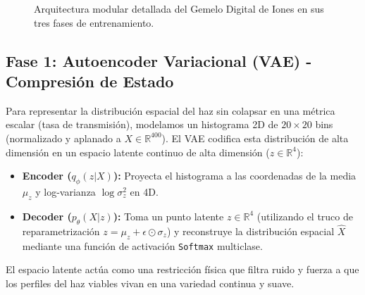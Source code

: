 \documentclass[12pt,letterpaper]{article}
\begin{document}
\begin{figure}[H]
    \caption{Arquitectura modular detallada del Gemelo Digital de Iones en sus tres fases de entrenamiento.}
    \label{fig:arquitectura_block}
\end{figure}

\subsection{Fase 1: Autoencoder Variacional (VAE) - Compresión de Estado}
Para representar la distribución espacial del haz sin colapsar en una métrica escalar (tasa de transmisión), modelamos un histograma 2D de $20 \times 20$ bins (normalizado y aplanado a $X \in \mathbb{R}^{400}$). 
El VAE codifica esta distribución de alta dimensión en un espacio latente continuo de alta dimensión ($z \in \mathbb{R}^4$):
\begin{itemize}
    \item \textbf{Encoder ($q_\phi(z|X)$):} Proyecta el histograma a las coordenadas de la media $\mu_z$ y log-varianza $\log\sigma_z^2$ en 4D.
    \item \textbf{Decoder ($p_\theta(X|z)$):} Toma un punto latente $z \in \mathbb{R}^4$ (utilizando el truco de reparametrización $z = \mu_z + \epsilon \odot \sigma_z$) y reconstruye la distribución espacial $\hat{X}$ mediante una función de activación \texttt{Softmax} multiclase.
\end{itemize}
El espacio latente actúa como una restricción física que filtra ruido y fuerza a que los perfiles del haz viables vivan en una variedad continua y suave.
\end{document}
